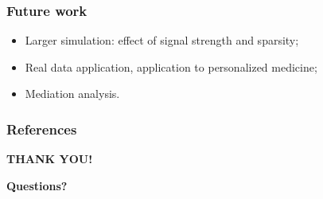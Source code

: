 \documentclass[10pt]{beamer}
\theoremstyle{definition}
\newcommand{\colubf}{\color{UniBlue}\bf}
\begin{document}

\begin{frame}
\frametitle{Future work}

\begin{itemize}
\item Larger simulation: effect of signal strength and sparsity;
\vspace{1em}

\item Real data application, application to personalized medicine;
\vspace{1em}

\item Mediation analysis.
\end{itemize}
\end{frame}

\begin{frame}
\frametitle{References}
{\scriptsize


}
\end{frame}


\begin{frame}
\centering
{\huge\textcolor{UniBlue}{\textbf{THANK YOU!}}}\\

\vspace{2em}

\vspace{1em}
{\colubf Questions?}
\end{frame}
\end{document}
